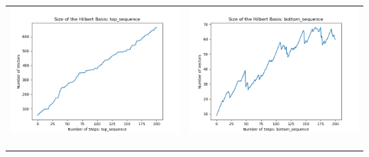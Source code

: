 \documentclass[10pt]{article}
\begin{document}
\begin{tabular}{c|c}
\begin{minipage}{.45\textwidth}
\includegraphics[width=\textwidth]{"DATA/5d/6 generators 2 bound C/top_sequence SIZE"}
\end{minipage} &
\begin{minipage}{.45\textwidth}
\includegraphics[width=\textwidth]{"DATA/5d/6 generators 2 bound C bottomup/bottom_sequence SIZE"}
\end{minipage} \\ \\
\hline \\\begin{minipage}{.45\textwidth}

\end{minipage}
\end{tabular}
\end{document}
